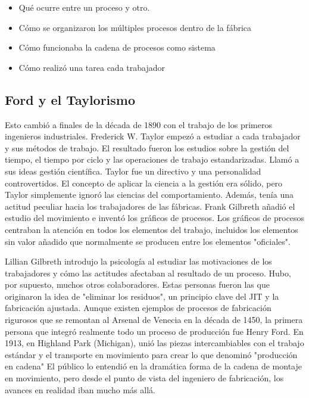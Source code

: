 \begin{itemize}
    \item Qué ocurre entre un proceso y otro.
    \item Cómo se organizaron los múltiples procesos dentro de la fábrica
    \item Cómo funcionaba la cadena de procesos como sistema
    \item Cómo realizó una tarea cada trabajador
\end{itemize}

\subsection{Ford y el Taylorismo}

Esto cambió a finales de la década de 1890 con el trabajo de los primeros ingenieros industriales.
Frederick W. Taylor empezó a estudiar a cada trabajador y sus métodos de trabajo.
El resultado fueron los estudios sobre la gestión del tiempo, el tiempo por ciclo y las operaciones de trabajo estandarizadas.
Llamó a sus ideas gestión científica.
Taylor fue un directivo y una personalidad controvertidos.
El concepto de aplicar la ciencia a la gestión era sólido, pero Taylor simplemente ignoró las ciencias del comportamiento.
Además, tenía una actitud peculiar hacia los trabajadores de las fábricas.
Frank Gilbreth añadió el estudio del movimiento e inventó los gráficos de procesos.
Los gráficos de procesos centraban la atención en todos los elementos del trabajo, incluidos los elementos sin valor añadido que normalmente se producen entre los elementos "oficiales".

Lillian Gilbreth introdujo la psicología al estudiar las motivaciones de los trabajadores y cómo las actitudes afectaban al resultado de un proceso.
Hubo, por supuesto, muchos otros colaboradores.
Estas personas fueron las que originaron la idea de "eliminar los residuos", un principio clave del JIT y la fabricación ajustada.
Aunque existen ejemplos de procesos de fabricación rigurosos que se remontan al Arsenal de Venecia en la década de 1450, la primera persona que integró realmente todo un proceso de producción fue Henry Ford.
En 1913, en Highland Park (Michigan), unió las piezas intercambiables con el trabajo estándar y el transporte en movimiento para crear lo que denominó "producción en cadena"
El público lo entendió en la dramática forma de la cadena de montaje en movimiento, pero desde el punto de vista del ingeniero de fabricación, los avances en realidad iban mucho más allá.

